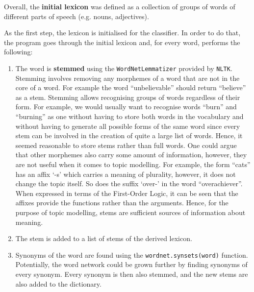 Overall, the \textbf{initial lexicon} was defined as a collection of groups of words of different parts of speech (e.g. nouns, adjectives). 

As the first step, the lexicon is initialised for the classifier. In order to do that, the program goes through the initial lexicon and, for every word, performs the following:
\begin{enumerate}
    \item The word is \textbf{stemmed} using the \texttt{WordNetLemmatizer} provided by \texttt{NLTK}. Stemming involves removing any morphemes of a word that are not in the core of a word. For example the word ``unbelievable'' should return ``believe'' as a stem. Stemming allows recognising groups of words regardless of their form. For example, we would usually want to recognise words ``burn'' and ``burning'' as one without having to store both words in the vocabulary and without having to generate all possible forms of the same word since every stem can be involved in the creation of quite a large list of words. Hence, it seemed reasonable to store stems rather than full words. One could argue that other morphemes also carry some amount of information, however, they are not useful when it comes to topic modelling. For example, the form ``cats'' has an affix `-s' which carries a meaning of plurality, however, it does not change the topic itself. So does the suffix `over-' in the word ``overachiever''. When expressed in terms of the First-Order Logic, it can be seen that the affixes provide the functions rather than the arguments. Hence, for the purpose of topic modelling, stems are sufficient sources of information about meaning.
    \item The stem is added to a list of stems of the derived lexicon.
    \item Synonyms of the word are found using the \texttt{wordnet.synsets(word)} function. Potentially, the word network could be grown further by finding synonyms of every synonym. Every synonym is then also stemmed, and the new stems are also added to the dictionary. 
\end{enumerate}
